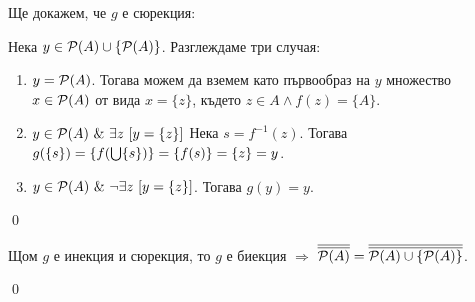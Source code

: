 \quad
Ще докажем, че $g$ е сюрекция:
\begin{tcolorbox}[mybox={Доказателство:}]
\quad
Нека $y \in \mathcal{P}(A) \cup \{\mathcal{P}(A)\}$.
Разглеждаме три случая:
\begin{enumerate}[label={\arabic* сл.}]
\item
$y = \mathcal{P}(A)$. Тогава можем да вземем като първообраз на $y$ множество $x \in \mathcal{P}(A)$ от вида $x = \{z\}$,
където $z \in A \land f(z) = \{A\}$.

\item
$y \in \mathcal{P}(A) \ \&\  \exists z\ [y = \{z\}]$
Нека $s = f^{-1}(z)$. Тогава $g(\{s\}) = \{f(\bigcup \{s\})\} = \{f(s)\} = \{z\} = y$.

\item
$y \in \mathcal{P}(A) \ \&\  \neg \exists z\ [y = \{z\}]$.
Тогава $g(y) = y$.
\end{enumerate}
\qed
\end{tcolorbox}

\quad
Щом $g$ е инекция и сюрекция, то $g$ е биекция $\Rightarrow$
$\overline{\overline{\mathcal{P}(A)}} = \overline{\overline{\mathcal{P}(A) \cup \{\mathcal{P}(A)\}}}$.

\qed

